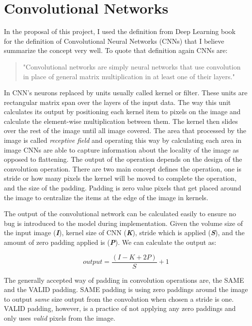 \section{Convolutional Networks} \label{sec:convnets}
In the proposal of this project, I used the definition from Deep Learning book~\cite{deeplearningbook} for the definition of Convolutional Neural Networks (CNNs) that I believe summarize the concept very well. 
To quote that definition again CNNs are:
\begin{quote}
  "Convolutional networks are simply neural networks that use convolution in place of general matrix multiplication in at least one of their layers."
\end{quote}

In CNN's neurons replaced by units usually called kernel or filter.
These units are rectangular matrix span over the layers of the input data. 
The way this unit calculates its output by positioning each kernel item to pixels on the image and calculate the element-wise multiplication between them. 
The kernel then slides over the rest of the image until all image covered. 
The area that processed by the image is called \emph{receptive field} and operating this way by calculating each area in image CNNs are able to capture information about the locality of the image as opposed to flattening.
The output of the operation depends on the design of the convolution operation.
There are two main concept defines the operation, one is stride or how many pixels the kernel will be moved to complete the operation, and the size of the padding.
Padding is zero value pixels that get placed around the image to centralize the items at the edge of the image in kernels.

The output of the convolutional network can be calculated easily to ensure no bug is introduced to the model during implementation.
Given the volume size of the input image (\textbf{\textit{I}}), kernel size of CNN (\textbf{\textit{K}}), stride which is applied (\textbf{\textit{S}}), and the amount of zero padding applied is (\textbf{\textit{P}}). We can calculate the output as:

\begin{equation}
  output = \frac{(I - K + 2P)}{S} + 1  
\end{equation}

The generally accepted way of padding in convolution operations are, the SAME and the VALID padding.
SAME padding is using zero paddings around the image to output \emph{same} size output from the convolution when chosen a stride is one.
VALID padding, however, is a practice of not applying any zero paddings and only uses \emph{valid} pixels from the image.

